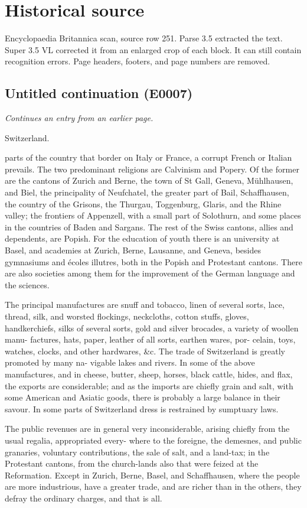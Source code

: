 \documentclass{article}
\begin{document}
\section*{Historical source}
Encyclopaedia Britannica scan, source row 251. Parse 3.5 extracted the text. Super 3.5 VL corrected it from an enlarged crop of each block. It can still contain recognition errors.
Page headers, footers, and page numbers are removed.

\subsection*{Untitled continuation (E0007)}
\textit{Continues an entry from an earlier page.}

Switzerland.

parts of the country that border on Italy or France, a corrupt French or Italian prevails. The two predominant religions are Calvinism and Popery. Of the former are the cantons of Zurich and Berne, the town of St Gall, Geneva, Mühlhausen, and Biel, the principality of Neufchatel, the greater part of Bail, Schaffhausen, the country of the Grisons, the Thurgau, Toggenburg, Glaris, and the Rhine valley; the frontiers of Appenzell, with a small part of Solothurn, and some places in the countries of Baden and Sargans. The rest of the Swiss cantons, allies and dependents, are Popish. For the education of youth there is an university at Basel, and academies at Zurich, Berne, Lausanne, and Geneva, besides gymnasiums and écoles illutres, both in the Popish and Protestant cantons. There are also societies among them for the improvement of the German language and the sciences.

The principal manufactures are snuff and tobacco, linen
of several sorts, lace, thread, silk, and worsted flockings,
neckcloths, cotton stuffs, gloves, handkerchiefs, silks of several
sorts, gold and silver brocades, a variety of woollen manu-
factures, hats, paper, leather of all sorts, earthen wares, por-
celain, toys, watches, clocks, and other hardwares, \&c.
The trade of Switzerland is greatly promoted by many na-
vigable lakes and rivers. In some of the above manufactures,
and in cheese, butter, sheep, horses, black cattle, hides, and
flax, the exports are considerable; and as the imports are
chiefly grain and salt, with some American and Asiatic goods,
there is probably a large balance in their savour. In some
parts of Switzerland dress is restrained by sumptuary laws.

The public revenues are in general very inconsiderable,
arising chiefly from the usual regalia, appropriated every-
where to the foreigne, the demesnes, and public granaries,
voluntary contributions, the sale of salt, and a land-tax; in
the Protestant cantons, from the church-lands also that were
feized at the Reformation. Except in Zurich, Berne, Basel,
and Schaffhausen, where the people are more industrious,
have a greater trade, and are richer than in the others, they
defray the ordinary charges, and that is all.
\end{document}
